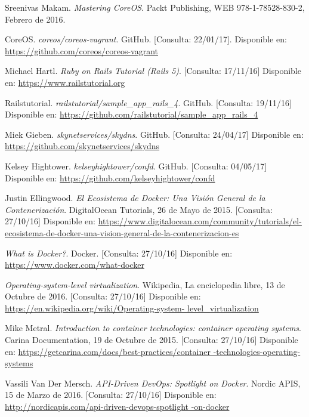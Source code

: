 \begin{thebibliography}{9}

Sreenivas Makam.
\textit{Mastering CoreOS}. 
Packt Publishing, WEB 978-1-78528-830-2, Febrero de 2016.

CoreOS.
\textit{coreos/coreos-vagrant}. GitHub. [Consulta: 22/01/17].
Disponible en: \url{https://github.com/coreos/coreos-vagrant}

Michael Hartl.
\textit{Ruby on Rails Tutorial (Rails 5)}. [Consulta: 17/11/16]
Disponible en: \url{https://www.railstutorial.org}

Railstutorial.
\textit{railstutorial/sample\_app\_rails\_4}. GitHub. [Consulta: 19/11/16]
Disponible en: \url{https://github.com/railstutorial/sample\_app\_rails\_4}

Miek Gieben.
\textit{skynetservices/skydns}. GitHub. [Consulta: 24/04/17]
Disponible en: \url{https://github.com/skynetservices/skydns}

Kelsey Hightower.
\textit{kelseyhightower/confd}. GitHub. [Consulta: 04/05/17]
Disponible en: \url{https://github.com/kelseyhightower/confd}

Justin Ellingwood.
\textit{El Ecosistema de Docker: Una Visión General de la Contenerización}. 
DigitalOcean Tutorials, 26 de Mayo de 2015. [Consulta: 27/10/16]
Disponible en: \url{https://www.digitalocean.com/community/tutorials/el-ecosistema-de-docker-una-vision-general-de-la-contenerizacion-es}

\textit{What is Docker?}. Docker. [Consulta: 27/10/16]
Disponible en: \url{https://www.docker.com/what-docker}

\textit{Operating-system-level virtualization}. 
Wikipedia, La enciclopedia libre, 13 de Octubre de 2016. [Consulta: 27/10/16]
Disponible en: \url{https://en.wikipedia.org/wiki/Operating-system-
level\_virtualization}

Mike Metral.
\textit{Introduction to container technologies: container operating systems}. 
Carina Documentation, 19 de Octubre de 2015. [Consulta: 27/10/16]
Disponible en: \url{https://getcarina.com/docs/best-practices/container
-technologies-operating-systems}

Vassili Van Der Mersch.
\textit{API-Driven DevOps: Spotlight on Docker}. 
Nordic APIS, 15 de Marzo de 2016. [Consulta: 27/10/16]
Disponible en: \url{http://nordicapis.com/api-driven-devops-spotlight
-on-docker}


\end{thebibliography}
